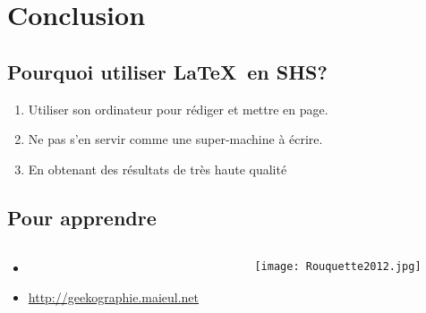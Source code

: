\section{Conclusion}

\subsection{Pourquoi utiliser \LaTeX\ en SHS?}

\begin{slide}
  \begin{enumerate}
    \item Utiliser son ordinateur pour rédiger et mettre en page.
    \item Ne pas s'en servir comme une super-machine à écrire.
    \item En obtenant des résultats de très haute qualité
  \end{enumerate}
\end{slide}
\subsection{Pour apprendre}
\begin{slide}
  \beamerdefaultoverlayspecification{}
  \begin{columns}
    \begin{column}{.45\textwidth}
	\begin{itemize}
	  \item \cite{Rouquette2012}
	  \item \url{http://geekographie.maieul.net}
	\end{itemize}
    \end{column}
    \begin{column}{.45\textwidth}
      \texttt{[image: Rouquette2012.jpg]}
    \end{column}
  
  \end{columns}

\end{slide}

